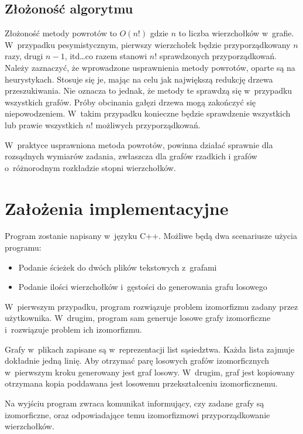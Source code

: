 \documentclass[12pt, a4paper, ]{article} %
\begin{document}
\subsection{Złożoność algorytmu}

Złożoność metody powrotów to $O(n!)$ gdzie $n$ to liczba wierzchołków w~grafie.
W~przypadku pesymistycznym, pierwszy wierzchołek będzie przyporządkowany $n$ razy,
drugi $n - 1$, itd\dots co razem stanowi $n!$ sprawdzonych przyporządkowań.
Należy zaznaczyć, że wprowadzone usprawnienia metody powrotów, oparte są na heurystykach.
Stosuje się je, mając na celu jak największą redukcję drzewa przeszukiwania. Nie oznacza
to jednak, że metody te sprawdzą się w~przypadku wszystkich grafów. Próby obcinania gałęzi
drzewa mogą zakończyć się niepowodzeniem. W~takim przypadku konieczne będzie sprawdzenie wszystkich
lub prawie wszystkich $n!$ możliwych przyporządkowań.

W~praktyce usprawniona metoda powrotów, powinna działać sprawnie dla rozsądnych wymiarów zadania, zwłaszcza dla grafów rzadkich i
grafów o~różnorodnym rozkładzie stopni wierzchołków.

\section{Założenia implementacyjne}

Program zostanie napisany w~języku C++. Możliwe będą dwa scenariusze użycia programu:
\begin{itemize}
  \item Podanie ścieżek do dwóch plików tekstowych z~grafami
  \item Podanie ilości wierzchołków i~gęstości do generowania grafu losowego
\end{itemize}
W~pierwszym przypadku, program rozwiązuje problem izomorfizmu zadany przez użytkownika.
W~drugim, program sam generuje losowe grafy izomorficzne i~rozwiązuje problem ich izomorfizmu.

Grafy w~plikach zapisane są w~reprezentacji list sąsiedztwa. Każda lista zajmuje dokładnie jedną linię.
Aby otrzymać parę losowych grafów izomorficznych w~pierwszym kroku generowany jest graf losowy.
W~drugim, graf jest kopiowany otrzymana kopia poddawana jest losowemu przekształceniu izomorficznemu.

Na wyjściu program zwraca komunikat informujący, czy zadane grafy są izomorficzne, oraz
odpowiadające temu izomorfizmowi przyporządkowanie wierzchołków.
\end{document}
